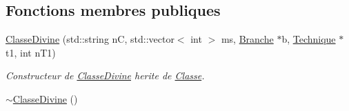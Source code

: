 \subsection*{Fonctions membres publiques}
\begin{DoxyCompactItemize}
\item 
\hyperlink{classClasseDivine_a1c6c42d3c8f3d92e6d0ded16fe7b82ad}{Classe\-Divine} (std\-::string n\-C, std\-::vector$<$ int $>$ ms, \hyperlink{classBranche}{Branche} $\ast$b, \hyperlink{classTechnique}{Technique} $\ast$t1, int n\-T1)
\begin{DoxyCompactList}\small\item\em Constructeur de \hyperlink{classClasseDivine}{Classe\-Divine} herite de \hyperlink{classClasse}{Classe}. \end{DoxyCompactList}\item 
\hypertarget{classClasseDivine_abfdf4a1e3c75e2ff45d9a4558b27a003}{\hyperlink{classClasseDivine_abfdf4a1e3c75e2ff45d9a4558b27a003}{$\sim$\-Classe\-Divine} ()}\label{classClasseDivine_abfdf4a1e3c75e2ff45d9a4558b27a003}


\end{DoxyCompactItemize}
